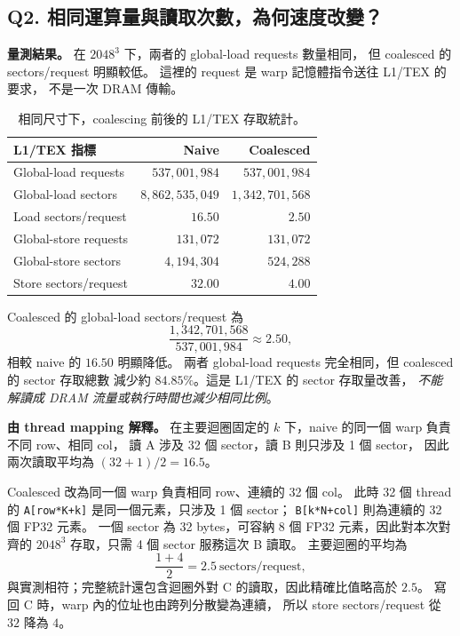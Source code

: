 \documentclass[UTF8,fontset=none,11pt,a4paper]{ctexart}
\begin{document}
\clearpage
\subsection*{Q2. 相同運算量與讀取次數，為何速度改變？}

\textbf{量測結果。}
在 $2048^3$ 下，兩者的 global-load requests 數量相同，
但 coalesced 的 sectors/request 明顯較低。
這裡的 request 是 warp 記憶體指令送往 L1/TEX 的要求，
不是一次 DRAM 傳輸。

\begin{table}[H]
\centering
\small
\begin{tabular}{@{}lrr@{}}
\toprule
L1/TEX 指標 & Naive & Coalesced \\
\midrule
Global-load requests & $537{,}001{,}984$ & $537{,}001{,}984$ \\
Global-load sectors & $8{,}862{,}535{,}049$ & $1{,}342{,}701{,}568$ \\
Load sectors/request & $16.50$ & $2.50$ \\
Global-store requests & $131{,}072$ & $131{,}072$ \\
Global-store sectors & $4{,}194{,}304$ & $524{,}288$ \\
Store sectors/request & $32.00$ & $4.00$ \\
\bottomrule
\end{tabular}
\caption{相同尺寸下，coalescing 前後的 L1/TEX 存取統計。}
\label{tab:part2-sectors}
\end{table}

Coalesced 的 global-load sectors/request 為
\[
\frac{1{,}342{,}701{,}568}{537{,}001{,}984}
\approx2.50,
\]
相較 naive 的 $16.50$ 明顯降低。
兩者 global-load requests 完全相同，但 coalesced 的 sector 存取總數
減少約 $84.85\%$。這是 L1/TEX 的 sector 存取量改善，
\emph{不能解讀成 DRAM 流量或執行時間也減少相同比例}。

\textbf{由 thread mapping 解釋。}
在主要迴圈固定的 $k$ 下，naive 的同一個 warp 負責不同 row、相同 col，
讀 A 涉及 32 個 sector，讀 B 則只涉及 1 個 sector，
因此兩次讀取平均為 $(32+1)/2=16.5$。

Coalesced 改為同一個 warp 負責相同 row、連續的 32 個 col。
此時 32 個 thread 的 \texttt{A[row*K+k]} 是同一個元素，只涉及 1 個 sector；
\texttt{B[k*N+col]} 則為連續的 32 個 FP32 元素。
一個 sector 為 32 bytes，可容納 8 個 FP32 元素，因此對本次對齊的
$2048^3$ 存取，只需 4 個 sector 服務這次 B 讀取。
主要迴圈的平均為
\[
\frac{1+4}{2}=2.5\ \text{sectors/request},
\]
與實測相符；完整統計還包含迴圈外對 C 的讀取，因此精確比值略高於 $2.5$。
寫回 C 時，warp 內的位址也由跨列分散變為連續，
所以 store sectors/request 從 $32$ 降為 $4$。
\end{document}
